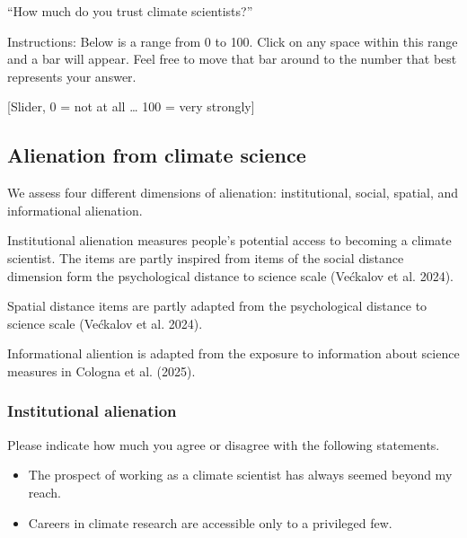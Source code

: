 \documentclass[
  letterpaper,
  DIV=11,
  numbers=noendperiod]{scrartcl}
\providecommand{\tightlist}{%
  \setlength{\itemsep}{0pt}\setlength{\parskip}{0pt}}
\begin{document}
``How much do you trust climate scientists?''

Instructions: Below is a range from 0 to 100. Click on any space within
this range and a bar will appear. Feel free to move that bar around to
the number that best represents your answer.

{[}Slider, 0 = not at all \ldots{} 100 = very strongly{]}

\subsection{Alienation from climate
science}\label{alienation-from-climate-science}

\begin{tcolorbox}[enhanced jigsaw, toprule=.15mm, toptitle=1mm, colframe=quarto-callout-note-color-frame, leftrule=.75mm, rightrule=.15mm, bottomtitle=1mm, coltitle=black, colbacktitle=quarto-callout-note-color!10!white, bottomrule=.15mm, breakable, opacityback=0, titlerule=0mm, title=\textcolor{quarto-callout-note-color}{\faInfo}\hspace{0.5em}{Note}, left=2mm, arc=.35mm, opacitybacktitle=0.6, colback=white]

We assess four different dimensions of alienation: institutional,
social, spatial, and informational alienation.

Institutional alienation measures people's potential access to becoming
a climate scientist. The items are partly inspired from items of the
social distance dimension form the psychological distance to science
scale (Većkalov et al. 2024).

Spatial distance items are partly adapted from the psychological
distance to science scale (Većkalov et al. 2024).

Informational aliention is adapted from the exposure to information
about science measures in Cologna et al. (2025).

\end{tcolorbox}

\subsubsection{Institutional alienation}\label{institutional-alienation}

Please indicate how much you agree or disagree with the following
statements.

\begin{itemize}
\tightlist
\item
  The prospect of working as a climate scientist has always seemed
  beyond my reach.
\item
  Careers in climate research are accessible only to a privileged few.
\end{itemize}
\end{document}
